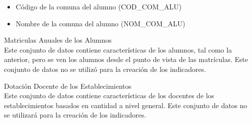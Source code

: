 \begin{longdescription}
\begin{itemize}
              \item Código de la comuna del alumno (COD\_COM\_ALU)
              \item Nombre de la comuna del alumno (NOM\_COM\_ALU)
            \end{itemize}
        \item[Matriculas Anuales de los Alumnos] \hfill \\
        Este conjunto de datos contiene características de los alumnos, tal como la anterior, pero se ven los alumnos desde el punto de vista de las matrículas.
        Este conjunto de datos no se utilizó para la creación de los indicadores.
        
        \item[Dotación Docente de los Establecimientos] \hfill \\
        Este conjunto de datos contiene características de los docentes de los establecimientos basados en cantidad a nivel general. Este conjunto de datos no se utilizará para la creación de los indicadores.
        

\end{longdescription}
